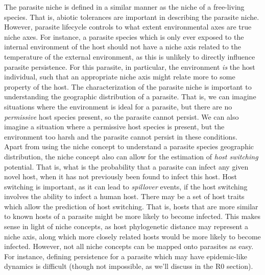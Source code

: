 \documentclass[12pt]{article}
\begin{document}
The parasite niche is defined in a similar manner as the niche of a free-living species. That is, abiotic tolerances are important in describing the parasite niche. However, parasite lifecycle controls to what extent environmental axes are true niche axes. For instance, a parasite species which is only ever exposed to the internal environment of the host should not have a niche axis related to the temperature of the external environment, as this is unlikely to directly influence parasite persistence. For this parasite, in particular, the environment \textit{is} the host individual, such that an appropriate niche axis might relate more to some property of the host. The characterization of the parasite niche is important to understanding the geographic distribution of a parasite. That is, we can imagine situations where the environment is ideal for a parasite, but there are no \textit{permissive} host species present, so the parasite cannot persist. We can also imagine a situation where a permissive host species is present, but the environment too harsh and the parasite cannot persist in these conditions. \\



Apart from using the niche concept to understand a parasite species geographic distribution, the niche concept also can allow for the estimation of \textit{host switching} potential. That is, what is the probability that a parasite can infect any given novel host, when it has not previously been found to infect this host. Host switching is important, as it can lead to \textit{spillover} events, if the host switching involves the ability to infect a human host. There may be a set of host traits which allow the prediction of host switching. That is, hosts that are more similar to known hosts of a parasite might be more likely to become infected. This makes sense in light of niche concepts, as host phylogenetic distance may represent a niche axis, along which more closely related hosts would be more likely to become infected. However, not all niche concepts can be mapped onto parasites as easy. For instance, defining persistence for a parasite which may have epidemic-like dynamics is difficult (though not impossible, as we'll discuss in the R0 section). \\
\end{document}
